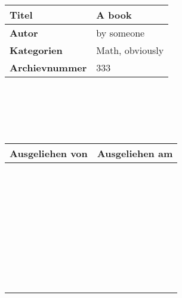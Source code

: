 \documentclass[10pt,a5paper]{article}
\begin{document}
\begin{tabular}{p{}|p{}}

  \textbf{Titel}	& A book \\
  \hline
  \textbf{Autor}	& by someone \\
  \hline	
  \textbf{Kategorien} & Math, obviously\\
  \hline	
  \textbf{Archievnummer} & 333 \\

\end{tabular}
\\
\\
\\
\\	
\begin{tabular}{p{}|p{}}
  \textbf{Ausgeliehen von}	& \textbf{Ausgeliehen am} \\
  \hline
& \\& \\
\hline
& \\& \\
\hline
& \\& \\
\hline
& \\& \\
\hline
& \\& \\
\hline
& \\& \\
\hline
& \\& \\
\hline
& \\& \\
\hline
& \\& \\
\hline
& \\& \\
\hline
& \\& \\
\hline
& \\& \\
\hline
& \\& \\
\hline
& \\& \\
\hline
& \\& \\
\hline
& \\& \\
\hline
& \\& \\
\hline
& \\& \\
\hline

\end{tabular}
\end{document}
